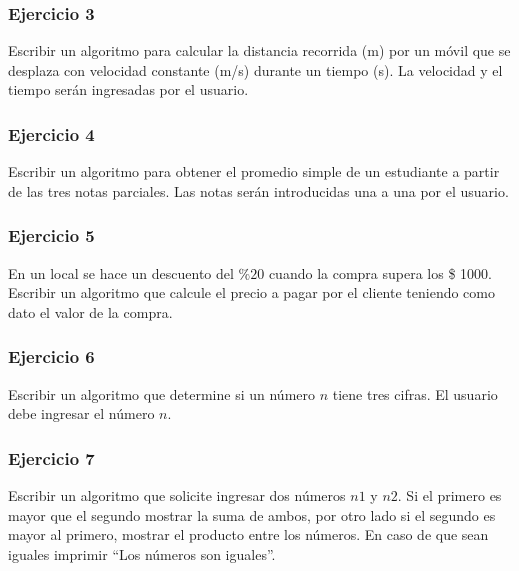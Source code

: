 \subsubsection{Ejercicio 3}
Escribir un algoritmo para calcular la distancia recorrida (m) por un móvil que se desplaza con velocidad constante (m/s) durante un tiempo (s). 
La velocidad y el tiempo serán ingresadas por el usuario.

\subsubsection{Ejercicio 4}
Escribir un algoritmo para obtener el promedio simple de un estudiante a partir de las tres notas parciales.
Las notas serán introducidas una a una por el usuario.

\subsubsection{Ejercicio 5}
En un local se hace un descuento del $\mathrm{\%20}$ cuando la compra supera los \$ 1000. Escribir un algoritmo que calcule el precio a pagar por el cliente
teniendo como dato el valor de la compra.

\subsubsection{Ejercicio 6}
Escribir un algoritmo que determine si un número $n$ tiene tres cifras. El usuario debe ingresar el número $n$.

\subsubsection{Ejercicio 7}
Escribir un algoritmo que solicite ingresar dos números $n1$ y $n2$. Si el primero es mayor que el segundo mostrar la suma de ambos, por otro lado si el segundo es mayor al primero, mostrar el producto entre los números. En caso de que sean iguales imprimir ``Los números son iguales''.
